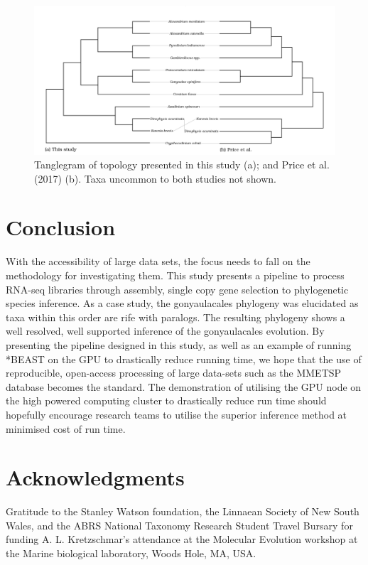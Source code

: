 \documentclass[12pt]{article}
\begin{document}
\FloatBarrier 
\begin{figure} 
\includegraphics[scale=.23]{Price-comparison.png} 
\caption{Tanglegram of topology presented in this study (a); and Price et al. (2017) (b). Taxa uncommon to both studies not shown.} 
\label{fig:tangle}
\end{figure} 
\FloatBarrier

\newpage
\section{Conclusion}
With the accessibility of large data sets, the focus needs to fall on the methodology for investigating them. This study presents a pipeline to process RNA-seq libraries through assembly, single copy gene selection to phylogenetic species inference. As a case study, the gonyaulacales phylogeny was elucidated as taxa within this order are rife with paralogs. The resulting phylogeny shows a well resolved, well supported inference of the gonyaulacales evolution. By presenting the pipeline designed in this study, as well as an example of running *BEAST on the GPU to drastically reduce running time, we hope that the use of reproducible, open-access processing of large data-sets such as the MMETSP database becomes the standard. The demonstration of utilising the GPU node on the high powered computing cluster to drastically reduce run time should hopefully encourage research teams to utilise the superior inference method at minimised cost of run time. 
\newpage

\section{Acknowledgments}
Gratitude to the Stanley Watson foundation, the Linnaean Society of New South Wales, and the ABRS National Taxonomy Research Student Travel Bursary for funding A. L. Kretzschmar's attendance at the Molecular Evolution workshop at the Marine biological laboratory, Woods Hole, MA, USA. 
\end{document}
